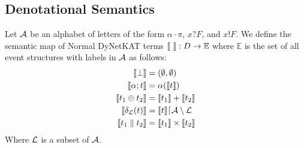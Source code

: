 \subsection{Denotational Semantics}

\begin{definition}
    Let $\mathcal{A}$ be an alphabet of letters of the form
    $\alpha \cdot \pi$,
    $x?F$, and $x!F$.
    We define the semantic map of Normal DyNetKAT terms
    $\llbracket  \  \rrbracket: D \rightarrow \mathbb{E}$ where
    $\mathbb{E}$ is the set of all event structures with
    labels in $\mathcal{A}$ as follows:
    \begin{align*}
        \llbracket \bot \rrbracket      & = (\emptyset,\emptyset)                  \\
        \llbracket \alpha; t \rrbracket & = \alpha(\llbracket t \rrbracket)                        \\
        \llbracket t_1 \oplus t_2 \rrbracket
                        & = \llbracket t_1 \rrbracket + \llbracket t_2 \rrbracket                  \\
        \llbracket \delta_{\mathcal{L}}(t) \rrbracket
                        & = \llbracket t \rrbracket \lceil \mathcal{A} \setminus \mathcal{L} \\
        \llbracket t_1 \parallel t_2 \rrbracket
                        & = \llbracket t_1 \rrbracket \times \llbracket t_2 \rrbracket
    \end{align*}
    Where $\mathcal{L}$ is a subset of $\mathcal{A}$.
\end{definition}



